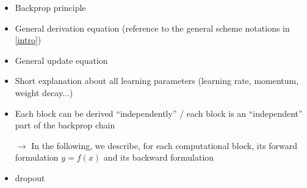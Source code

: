 \begin{itemize}
 \item Backprop principle
 \item General derivation equation (reference to the general scheme notations in \ref{intro})
 \item General update equation
 \item Short explanation about all learning parameters (learning rate, momentum, weight decay...)
 \item Each block can be derived ``independently'' / each block is an ``independent'' part of the backprop chain
 \item[$\rightarrow$] In the following, we describe, for each computational block, its forward formulation $y = f(x)$ and its backward formulation
 \item dropout
\end{itemize}
